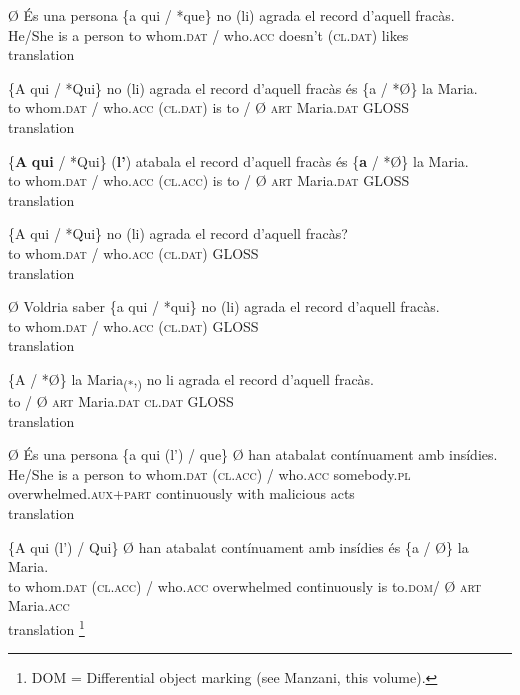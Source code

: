 \documentclass[output=paper,modfonts,nonflat,newtxmath]{langsci/langscibook}
\begin{document}
 \ea Ø És una persona \{a qui / *que\} no (li) agrada el record d’aquell fracàs.\\
  He/She is a person to whom.\textsc{dat} / who.\textsc{acc} doesn’t (\textsc{cl.dat}) likes\\
 \glt translation
 
 \ex \label{ex:royo:15b}
 \gll  \{A qui / *Qui\} no (li) agrada el record d’aquell fracàs és \{a / *Ø\} la Maria.\\
  to whom.\textsc{dat} / who.\textsc{acc} (\textsc{cl.dat}) is to / Ø \textsc{art} Maria.\textsc{dat} GLOSS\\
 \glt translation
 
 \ex \label{ex:royo:15b}
 \gll \{\textbf{A} \textbf{qui} / *Qui\} (\textbf{l’}) atabala el record d’aquell fracàs és \{\textbf{a} / *Ø\} la Maria.\\
 to whom.\textsc{dat} / who.\textsc{acc} (\textsc{cl.acc}) is to / Ø \textsc{art} Maria.\textsc{dat} GLOSS\\
 \glt translation
 
 \ex \label{ex:royo:15c}
 \gll \{A qui / *Qui\} no (li) agrada el record d’aquell fracàs?\\
 to whom.\textsc{dat} / who.\textsc{acc} (\textsc{cl.dat}) GLOSS\\
 \glt translation
 
 \ex \label{ex:royo:15d}
 \gll Ø Voldria saber \{a qui / *qui\} no (li) agrada el record d’aquell fracàs.\\
  to whom.\textsc{dat} / who.\textsc{acc} (\textsc{cl.dat}) GLOSS\\
 \glt translation
 
 \ex \label{ex:royo:15e}
 \gll \{A / *Ø\} la Maria\textsubscript{(*},\textsubscript{)} no li agrada el record d’aquell fracàs.\\
 to / Ø \textsc{art} Maria.\textsc{dat} \textsc{cl.dat} GLOSS\\
 \glt translation
 
 \z
 \z

 
\ea%
 \label{ex:royo:16}
 \ea \label{ex:royo:16a}
 \gll Ø És una persona \{a qui (l’) / que\} Ø han atabalat contínuament amb insídies.\\
 He/She is a person to whom.\textsc{dat} (\textsc{cl.acc}) / who.\textsc{acc} somebody.\textsc{pl} overwhelmed.\textsc{aux}+\textsc{part} continuously with malicious acts\\
 \glt translation
 
 \ex \label{ex:royo:16b}
	\gll \{A qui (l’) / Qui\} Ø han atabalat contínuament amb insídies és \{a / Ø\} la Maria.\\
	 to whom.\textsc{dat} (\textsc{cl.acc}) / who.\textsc{acc} overwhelmed continuously is to.\textsc{dom}/ Ø \textsc{art} Maria.\textsc{acc}\\
	 \glt translation \footnote{DOM = Differential object marking (see Manzani, this volume).}
	 
\end{document}
